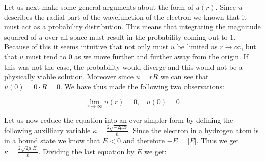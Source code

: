 \documentclass{article}
\begin{document}
    Let us next make some general arguments about the form of $u(r)$. Since $u$ describes the radial part of the wavefunction of the electron we known that it must act as a probability distribution.
    This means that integrating the magnitude squared of $u$ over all space must result in the probability coming out to $1$. Because of this it seems intuitive that not only must $u$ be limited as
    $r \to \infty$, but that $u$ must tend to $0$ as we move further and further away from the origin. If this was not the case, the probability would diverge and this would not be a physically viable
    solution. Moreover since $u = rR$ we can see that $u(0) = 0\cdot R = 0$. We have thus made the following two observations:

    \begin{equation}
        \label{eq:bounds}
        \lim_{r\to \infty}u(r) = 0, \ \ \ \ u(0) = 0 
    \end{equation}

    Let us now reduce the equation into an ever simpler form by defining the following auxilliary variable $\kappa = \frac{2\sqrt{-2\mu E}}{\hbar}$. Since the electron in a hydrogen atom is in a bound
    state we know that $E < 0$ and therefore $-E = |E|$. Thus we get $\kappa = \frac{2\sqrt{2\mu |E|}}{\hbar}$. Dividing the last equation by $E$ we get:
\end{document}
